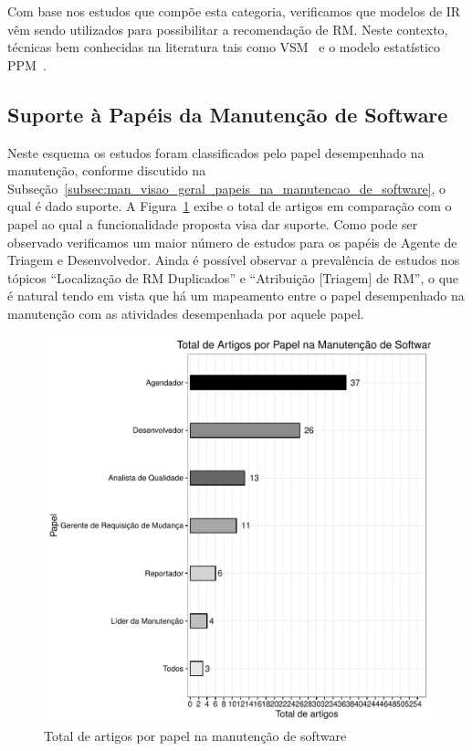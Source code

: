 Com base nos estudos que compõe esta categoria, verificamos que modelos de IR
vêm sendo utilizados para possibilitar a recomendação de RM\@. Neste contexto,
técnicas bem conhecidas na literatura tais como VSM~\cite{Wang2011bug} e o
modelo estatístico PPM~\cite{malheiros2012source}.

\subsection{Suporte à Papéis da Manutenção de Software}
\label{sub:extensões_com_suporte_a_papeis}

Neste esquema os estudos foram classificados pelo papel desempenhado na
manutenção, conforme discutido na
Subseção~\ref{subsec:man_visao_geral_papeis_na_manutencao_de_software}, o qual é
dado suporte. A Figura~\ref{fig:graf_papel_por_artigo} exibe o total de artigos
em comparação com o papel ao qual a funcionalidade proposta visa dar suporte.
Como pode ser observado verificamos um maior número de estudos para os papéis de
Agente de Triagem e Desenvolvedor. Ainda é possível observar a prevalência de
estudos nos tópicos ``Localização de RM Duplicados'' e ``Atribuição [Triagem] de
RM'', o que é natural tendo em vista que há um mapeamento entre o papel
desempenhado na manutenção com as atividades desempenhada por aquele papel.

\begin{figure}[htpb] \centering
	\includegraphics[width=0.7\linewidth]{chapter-mapeamento-sistematico/img/grafico_papel_por_artigo.pdf}
	\caption{Total de artigos por papel na manutenção de
		software}\label{fig:graf_papel_por_artigo} \end{figure}

